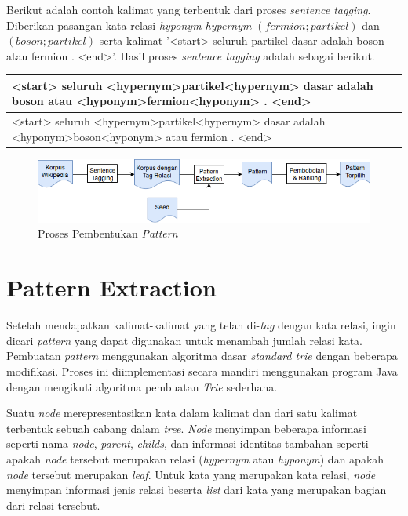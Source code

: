 Berikut adalah contoh kalimat yang terbentuk dari proses \textit{sentence tagging}. Diberikan pasangan kata relasi \textit{hyponym-hypernym} $(fermion;partikel)$ dan $(boson;partikel)$ serta kalimat  '<start> seluruh partikel dasar adalah boson atau fermion . <end>'. Hasil proses \textit{sentence tagging} adalah sebagai berikut.
\begin{center}
\begin{tabular}{ | m{32em} | } 
\hline
<start> seluruh <hypernym>partikel<hypernym> dasar adalah boson atau <hyponym>fermion<hyponym> . <end> \\ 
\hline
<start> seluruh <hypernym>partikel<hypernym> dasar adalah <hyponym>boson<hyponym> atau fermion . <end> \\ 
\hline
\end{tabular}
\end{center}

\begin{figure}
    \centering
    \includegraphics[width=\linewidth]{pics/Pic03-PatternExtraction}
    \caption{Proses Pembentukan \textit{Pattern}}
    \label{fig:pattern-extraction}
\end{figure}

\section{Pattern Extraction}
Setelah mendapatkan kalimat-kalimat yang telah di-\textit{tag} dengan kata relasi, ingin dicari \textit{pattern} yang dapat digunakan untuk menambah jumlah relasi kata. Pembuatan \textit{pattern} menggunakan algoritma dasar \textit{standard trie} dengan beberapa modifikasi. Proses ini diimplementasi secara mandiri menggunakan program Java dengan mengikuti algoritma pembuatan \textit{Trie} sederhana.

Suatu \textit{\textit{node}} merepresentasikan kata dalam kalimat dan dari satu kalimat terbentuk sebuah cabang dalam \textit{tree}. \textit{Node} menyimpan beberapa informasi seperti nama \textit{\textit{node}}, \textit{parent}, \textit{childs}, dan informasi identitas tambahan seperti apakah \textit{\textit{node}} tersebut merupakan relasi (\textit{hypernym} atau \textit{hyponym}) dan apakah \textit{\textit{node}} tersebut merupakan \textit{leaf}. Untuk kata yang merupakan kata relasi, \textit{\textit{node}} menyimpan informasi jenis relasi beserta \textit{list} dari kata yang merupakan bagian dari relasi tersebut. 

